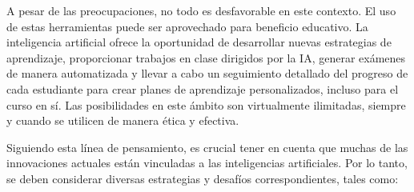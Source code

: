\documentclass[letterpaper, 12pt]{article}
\begin{document}
A pesar de las preocupaciones, no todo es desfavorable en
este contexto. El uso de estas herramientas puede ser
aprovechado para beneficio educativo. La inteligencia
artificial ofrece la oportunidad de desarrollar nuevas
estrategias de aprendizaje, proporcionar trabajos en clase
dirigidos por la IA, generar exámenes de manera
automatizada y llevar a cabo un seguimiento detallado del
progreso de cada estudiante para crear planes de
aprendizaje personalizados, incluso para el curso en sí.
Las posibilidades en este ámbito son virtualmente
ilimitadas, siempre y cuando se utilicen de manera ética y
efectiva.

Siguiendo esta línea de pensamiento, es crucial tener en
cuenta que muchas de las innovaciones actuales están
vinculadas a las inteligencias artificiales. Por lo tanto,
se deben considerar diversas estrategias y desafíos
correspondientes, tales como:
\end{document}
